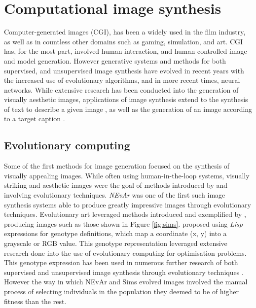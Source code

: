\documentclass{article}
\begin{document}
\section{Computational image synthesis}

Computer-generated images (CGI), has been a widely used in the film industry, as well as in countless other domains such as gaming, simulation, and art.
CGI has, for the most part, involved human interaction, and human-controlled image and model generation.
However generative systems and methods for both supervised, and unsupervised image synthesis have evolved in recent years with the increased use of evolutionary algorithms, and in more recent times, neural networks.
While extensive research has been conducted into the generation of visually aesthetic images, applications of image synthesis extend to the synthesis of text to describe a given image \citep{mathews2016senticap}, as well as the generation of an image according to a target caption \citep{reed2016generative,zhang2017stackgan}.


\subsection{Evolutionary computing}

Some of the first methods for image generation focused on the synthesis of visually appealing images.
While often using human-in-the-loop systems, visually striking and aesthetic images were the goal of methods introduced by \citet{sims} and \citet{nevar} involving evolutionary techniques.
\textit{NEvAr} \citep{nevar} was one of the first such image synthesis systems able to produce greatly impressive images through evolutionary techniques.
Evolutionary art leveraged methods introduced and exemplified by \citet{sims}, producing images such as those shown in Figure \ref{fig:sims}.
\citet{sims} proposed using \textit{Lisp} expressions for genotype definitions, which map a coordinate (x, y) into a grayscale or RGB value.
This genotype representation leveraged extensive research done into the use of evolutionary computing for optimisation problems.
This genotype expression has been used in numerous further research of both supervised and unsupervised image synthesis through evolutionary techniques \citep{nevar, sims, den2011evolving, distributed-evolutionary-art, aesthetic-measures}.
However the way in which NEvAr and Sims evolved images involved the manual process of selecting individuals in the population they deemed to be of higher fitness than the rest.
\end{document}
